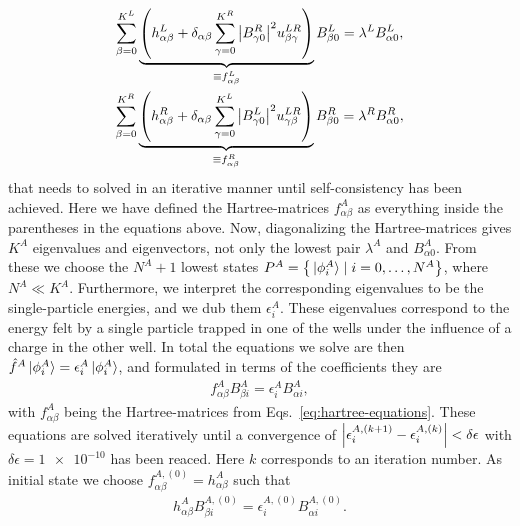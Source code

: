 \documentclass[twocolumn,superscriptaddress,unsortedaddress,
 amsmath,amssymb,
 aps,
]{revtex4-2}
\begin{document}
        \begin{equation}
            \begin{gathered}
                \sum_{\beta = 0}^{K^L}
                \underbrace{
                    \qty(
                        h^L_{\alpha \beta}
                        + \delta_{\alpha \beta}
                        \sum_{\gamma = 0}^{K^R}
                        \abs{B^R_{\gamma 0}}^2
                        u^{LR}_{\beta \gamma}
                    )
                }_{\equiv f^L_{\alpha \beta}}
                B^L_{\beta 0}
                = \lambda^L B^L_{\alpha 0},
                \\
                \sum_{\beta = 0}^{K^R}
                \underbrace{
                    \qty(
                        h^R_{\alpha \beta}
                        + \delta_{\alpha \beta}
                        \sum_{\gamma = 0}^{K^L}
                        \abs{B^L_{\gamma 0}}^2
                        u^{LR}_{\gamma \beta}
                    )
                }_{\equiv f^R_{\alpha \beta}}
                B^R_{\beta 0}
                = \lambda^R B^R_{\alpha 0},
            \end{gathered}
            \label{eq:hartree-equations}
        \end{equation}
        that needs to solved in an iterative manner until
        self-consistency has been achieved.
        Here we have defined the Hartree-matrices
        $f^A_{\alpha \beta}$ as everything inside the parentheses
        in the equations above.
        Now, diagonalizing the Hartree-matrices gives $K^A$
        eigenvalues and eigenvectors, not only the lowest
        pair $\lambda^A$ and $B^A_{\alpha 0}$.
        From these we choose the $N^A + 1$ lowest states
        $P^A = \qty{\ket*{\phi^A_{i}} \mid i = 0, \dots, N^A}$,
        where $N^A \ll K^A$.
        Furthermore, we interpret the corresponding eigenvalues
        to be the single-particle energies, and we dub them
        $\epsilon^A_i$.
        These eigenvalues correspond to the energy felt by a
        single particle trapped in one of the wells under the
        influence of a charge in the other well.
        In total the equations we solve are then $\hat{f}^A
        \ket*{\phi^A_i} = \epsilon^A_i \ket*{\phi^A_i}$, and
        formulated in terms of the coefficients they are
        \begin{align*}
            f^A_{\alpha \beta} B^A_{\beta i}
            = \epsilon^A_i B^A_{\alpha i},
        \end{align*}
        with $f^A_{\alpha \beta}$ being the Hartree-matrices
        from Eqs.~\eqref{eq:hartree-equations}.
        These equations are solved iteratively until a
        convergence of $\abs{\epsilon^{A, (k + 1)}_i -
        \epsilon^{A, (k)}_i} < \delta \epsilon$ with
        $\delta \epsilon = \num{1e-10}$ has been reaced.
        Here $k$ corresponds to an iteration number.
        As initial state we choose $f^{A, (0)}_{\alpha \beta}
        = h^A_{\alpha \beta}$ such that
        \begin{align*}
            h^A_{\alpha \beta} B^{A, (0)}_{\beta i}
            = \epsilon^{A, (0)}_i B^{A, (0)}_{\alpha i}.
        \end{align*}
\end{document}
